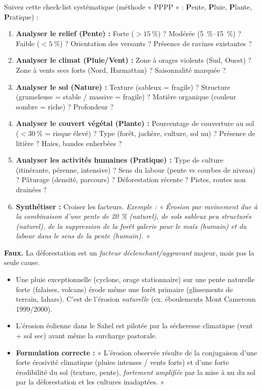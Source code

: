 \documentclass[11pt]{article}
\begin{document}
\begin{methode}
Suivez cette check-list systématique (méthode « PPPP » : \textbf{P}ente, \textbf{P}luie, \textbf{P}lante, \textbf{P}ratique) :
\begin{enumerate}
    \item \textbf{Analyser le relief (Pente) :} Forte ($> \SI{15}{\%}$) ? Modérée (\SIrange{5}{15}{\%}) ? Faible ($< \SI{5}{\%}$) ? Orientation des versants ? Présence de ravines existantes ?
    \item \textbf{Analyser le climat (Pluie/Vent) :} Zone à orages violents (Sud, Ouest) ? Zone à vents secs forts (Nord, Harmattan) ? Saisonnalité marquée ?
    \item \textbf{Analyser le sol (Nature) :} Texture (sableux = fragile) ? Structure (grumeleuse = stable / massive = fragile) ? Matière organique (couleur sombre = riche) ? Profondeur ?
    \item \textbf{Analyser le couvert végétal (Plante) :} Pourcentage de couverture au sol ($< \SI{30}{\%}$ = risque élevé) ? Type (forêt, jachère, culture, sol nu) ? Présence de litière ? Haies, bandes enherbées ?
    \item \textbf{Analyser les activités humaines (Pratique) :} Type de culture (itinérante, pérenne, intensive) ? Sens du labour (pente vs courbes de niveau) ? Pâturage (densité, parcours) ? Déforestation récente ? Pistes, routes non drainées ?
    \item \textbf{Synthétiser :} Croiser les facteurs. \emph{Exemple : « Érosion par ravinement due à la combinaison d'une pente de 20 \% (naturel), de sols sableux peu structurés (naturel), de la suppression de la forêt galerie pour le maïs (humain) et du labour dans le sens de la pente (humain). »}
\end{enumerate}
\end{methode}

\begin{attention}
\textbf{Faux.} La déforestation est un \emph{facteur déclenchant/aggravant} majeur, mais pas la seule cause.
\begin{itemize}
    \item Une pluie exceptionnelle (cyclone, orage stationnaire) sur une pente naturelle forte (falaises, volcans) érode même une forêt primaire (glissements de terrain, lahars). C'est de l'érosion \emph{naturelle} (ex. éboulements Mont Cameroun 1999/2000).
    \item L'érosion éolienne dans le Sahel est pilotée par la sécheresse climatique (vent + sol sec) avant même la surcharge pastorale.
    \item \textbf{Formulation correcte :} « L'érosion observée résulte de la conjugaison d'une forte érosivité climatique (pluies intenses / vents forts) et d'une forte érodibilité du sol (texture, pente), \emph{fortement amplifiée} par la mise à nu du sol par la déforestation et les cultures inadaptées. »
\end{itemize}
\end{attention}
\end{document}
